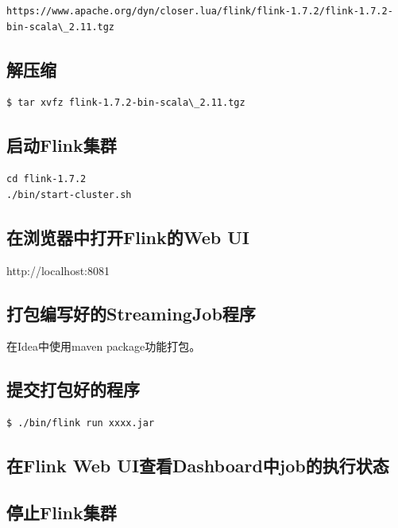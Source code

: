 \documentclass[oneside]{ctexbook}
\begin{document}
\begin{lstlisting}[breaklines]
https://www.apache.org/dyn/closer.lua/flink/flink-1.7.2/flink-1.7.2-bin-scala\_2.11.tgz
\end{lstlisting}

\subsection{解压缩}

\begin{lstlisting}
$ tar xvfz flink-1.7.2-bin-scala\_2.11.tgz
\end{lstlisting}

\subsection{启动Flink集群}

\begin{lstlisting}
cd flink-1.7.2
./bin/start-cluster.sh
\end{lstlisting}

\subsection{在浏览器中打开Flink的Web UI}

http://localhost:8081

\subsection{打包编写好的StreamingJob程序}

在Idea中使用maven package功能打包。

\subsection{提交打包好的程序}

\begin{lstlisting}
$ ./bin/flink run xxxx.jar
\end{lstlisting}

\subsection{在Flink Web UI查看Dashboard中job的执行状态}

\subsection{停止Flink集群}
\end{document}
